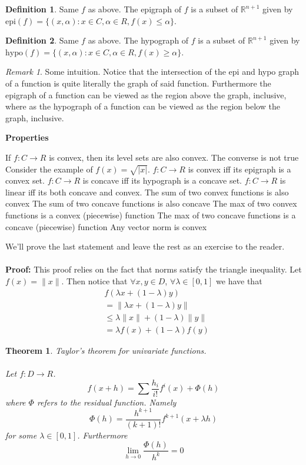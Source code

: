 \documentclass[titlepage]{article}
\theoremstyle{plain}
\newtheorem{thm}{Theorem}[section]
\theoremstyle{definition}
\newtheorem{defn}{Definition}[section]
\theoremstyle{remark}
\newtheorem*{rem}{Remark}
\begin{document}
\begin{defn}
Same $f$ as above. The epigraph of $f$ is a subset of $\mathbb{R}^{n+1}$ given
by $\text{epi}(f) = \{(x,\alpha) : x \in C, \alpha \in R, f(x) \leq \alpha\}$.
\end{defn}
\begin{defn}
Same $f$ as above. The hypograph of $f$ is a subset of $\mathbb{R}^{n+1}$ given
by $\text{hypo}(f) = \{(x,\alpha) : x \in C, \alpha \in R, f(x) \geq \alpha\}$.
\end{defn}
\begin{rem} Some intuition. Notice that the intersection of the epi and hypo graph of a function is quite
literally the graph of said function. Furthermore the epigraph of a function
can be viewed as the region above the graph, inclusive, where as the hypograph
of a function can be viewed as the region below the graph, inclusive.
\end{rem}
\textbf{Properties}
\begin{outline}[enumerate]
\1 If $f: C \to R$ is convex, then its level sets are also convex. The converse
is not true
\2 Consider the example of $f(x) = \sqrt{|x|}$.
\1 $f: C \to R$ is convex iff its epigraph is a convex set.
\1 $f: C \to R$ is concave iff its hypograph is a concave set.
\1 $f: C \to R$ is linear iff its both concave and convex.
\1 The sum of two convex functions is also convex
\1 The sum of two concave functions is also concave
\1 The max of two convex functions is a convex (piecewise) function
\1 The max of two concave functions is a concave (piecewise) function
\1 Any vector norm is convex
\end{outline}
We'll prove the last statement and leave the rest as an exercise to the
reader.\\\\
\noindent \textbf{Proof: } This proof relies on the fact that norms satisfy the
triangle inequality. Let $f(x) = \|x\|$. Then notice that $\forall x,y \in
D$, $\forall \lambda \in [0,1]$ we have that
\begin{align*}
&f(\lambda x + (1 - \lambda) y)\\
&= \|\lambda x + (1 - \lambda) y\|\\
&\leq \lambda\|x\| + (1 - \lambda)\|y\|\\
&= \lambda f(x) + (1 - \lambda) f(y)
\end{align*}
\begin{thm}
Taylor's theorem for univariate functions.\\\\ Let $f:D\to R$.
\[f(x + h) = \sum\frac{h_i}{i!} f^i(x)+ \Phi(h)\]
where $\Phi$ refers to the residual function. Namely
\[\Phi(h) = \frac{h^{k + 1}}{(k + 1)!} f^{k + 1}(x + \lambda h)\]
for some $\lambda \in [0,1]$. Furthermore
\[\lim_{h \to 0} \frac{\Phi(h)}{h^k} = 0\]
\end{thm}
\end{document}
